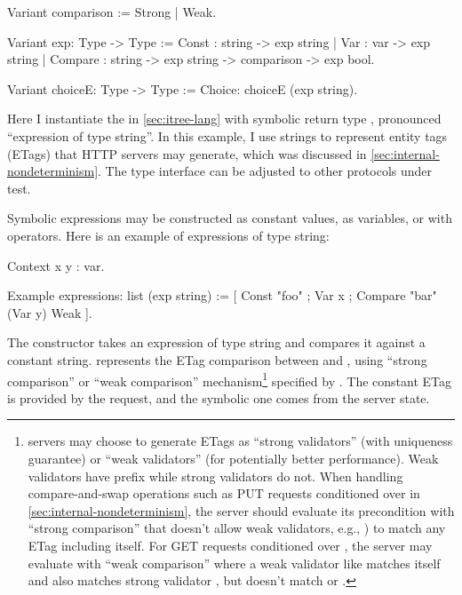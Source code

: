 \begin{coq}
  Variant comparison := Strong | Weak.

  Variant exp: Type -> Type :=
    Const    : string -> exp string
  | Var      : var    -> exp string
  | Compare  : string -> exp string -> comparison -> exp bool.

  Variant choiceE: Type -> Type :=
    Choice: choiceE (exp string).
\end{coq}

Here I instantiate the  in \autoref{sec:itree-lang} with symbolic
return type , pronounced ``expression of type string''.  In
this example, I use strings to represent entity tags (ETags) that HTTP servers
may generate, which was discussed in \autoref{sec:internal-nondeterminism}.  The
type interface can be adjusted to other protocols under test.

Symbolic expressions may be constructed as constant values, as variables, or
with operators.  Here is an example of expressions of type string:
\begin{coq}
  Context x y : var.

  Example expressions: list (exp string) :=
    [ Const   "foo"
    ; Var      x
    ; Compare "bar" (Var y) Weak
    ].
\end{coq}

The  constructor takes an expression of type string and compares it
against a constant string.   represents the ETag
comparison between  and , using ``strong comparison'' or ``weak
comparison'' mechanism\footnote{\http servers may choose to generate ETags as
``strong validators'' (with uniqueness guarantee) or ``weak validators'' (for
potentially better performance).  Weak validators have prefix  while
strong validators do not.  When handling compare-and-swap operations such as PUT
requests conditioned over  in
\autoref{sec:internal-nondeterminism}, the server should evaluate its
precondition with ``strong comparison'' that doesn't allow weak validators,
e.g., ) to match any ETag including itself.  For GET requests
conditioned over , the server may evaluate with ``weak
comparison'' where a weak validator like  matches itself and
also matches strong validator , but doesn't match 
or .\label{foot:etag}} specified by .  The constant ETag
is provided by the request, and the symbolic one comes from the server state.

